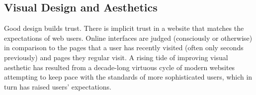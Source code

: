 \documentclass{sigchi}
\begin{document}





\subsection{Visual Design and Aesthetics}



Good design builds trust. There is implicit trust in a website that matches the expectations of web users. Online interfaces are judged (consciously or otherwise) in comparison to the pages that a user has recently visited (often only seconds previously) and pages they regular visit. A rising tide of improving visual aesthetic has resulted from a decade-long virtuous cycle of modern websites attempting to keep pace with the standards of more sophisticated users, which in turn has raised users' expectations.
\end{document}
